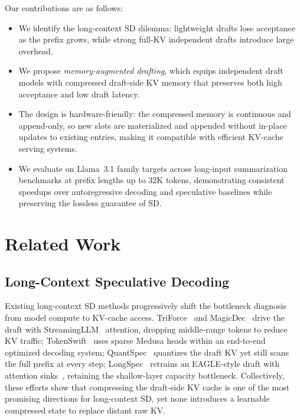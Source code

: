 Our contributions are as follows:
\begin{itemize}
    \item We identify the long-context SD dilemma: lightweight drafts lose acceptance as the prefix grows, while strong full-KV independent drafts introduce large overhead.
    
    \item We propose \emph{memory-augmented drafting}, which equips independent draft models with compressed draft-side KV memory that preserves both high acceptance and low draft latency.
    
    \item The design is hardware-friendly: the compressed memory is continuous and append-only, so new slots are materialized and appended without in-place updates to existing entries, making it compatible with efficient KV-cache serving systems.
    
    \item We evaluate on Llama~3.1 family targets across long-input summarization benchmarks at prefix lengths up to 32K tokens, demonstrating consistent speedups over autoregressive decoding and speculative baselines while preserving the lossless guarantee of SD.
\end{itemize}

\section{Related Work}

\subsection{Long-Context Speculative Decoding}

Existing long-context SD methods progressively shift the bottleneck diagnosis from model compute to KV-cache access.
TriForce~\citep{sun2024triforce} and MagicDec~\citep{sadhukhan2025magicdec} drive the draft with StreamingLLM~\citep{xiao2024efficient} attention, dropping middle-range tokens to reduce KV traffic;
TokenSwift~\citep{wu2025tokenswift} uses sparse Medusa heads within an end-to-end optimized decoding system;
QuantSpec~\citep{tiwariquantspec} quantizes the draft KV yet still scans the full prefix at every step;
LongSpec~\citep{yanglongspec} retrains an EAGLE-style draft with attention sinks~\citep{xiao2024efficient}, retaining the shallow-layer capacity bottleneck.
Collectively, these efforts show that compressing the draft-side KV cache is one of the most promising directions for long-context SD, yet none introduces a learnable compressed state to replace distant raw KV.

